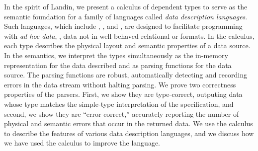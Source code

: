 In the spirit of Landin, we present a calculus of dependent types to
serve as the semantic foundation for a family of languages called
\textit{data description languages}.  Such languages, which include
\pads{}, \datascript{}, and \packettypes{}, are designed to facilitate
programming with \textit{ad hoc data}, \ie{}, data not in well-behaved
relational or \xml{} formats. In the calculus, each type describes the
physical layout and semantic properties of a data source. In the
semantics, we interpret the types simultaneously as the in-memory
representation for the data described and as parsing functions for the
data source. The parsing functions are robust, automatically detecting
and recording errors in the data stream without halting parsing.  We
prove two correctness properties of the parsers.  First, we show they
are type-correct, outputing data whose type matches the simple-type
interpretation of the specification, and second, we show they are
``error-correct,'' accurately reporting the number of physical and
semantic errors that occur in the returned data.  We use the calculus
to describe the features of various data description languages, and we
discuss how we have used the calculus to improve the \pads{} language.
